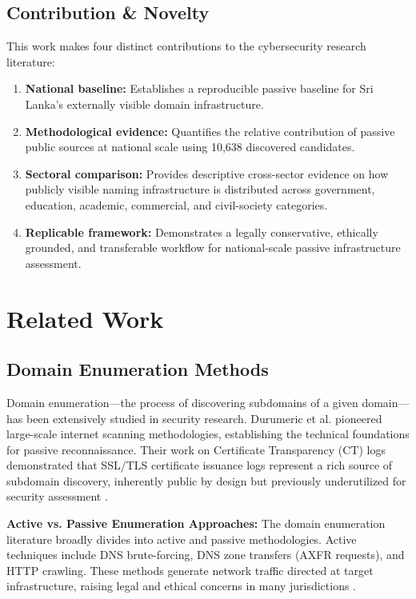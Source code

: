 \documentclass[preprint,review,12pt]{elsarticle}
\begin{document}
\subsection{Contribution \& Novelty}

This work makes four distinct contributions to the cybersecurity research literature:

\begin{enumerate}
    \item \textbf{National baseline:} Establishes a reproducible passive baseline for Sri Lanka's externally visible domain infrastructure.
    \item \textbf{Methodological evidence:} Quantifies the relative contribution of passive public sources at national scale using 10,638 discovered candidates.
    \item \textbf{Sectoral comparison:} Provides descriptive cross-sector evidence on how publicly visible naming infrastructure is distributed across government, education, academic, commercial, and civil-society categories.
    \item \textbf{Replicable framework:} Demonstrates a legally conservative, ethically grounded, and transferable workflow for national-scale passive infrastructure assessment.
\end{enumerate}

\section{Related Work}
\label{sec:related}

\subsection{Domain Enumeration Methods}

Domain enumeration—the process of discovering subdomains of a given domain—has been extensively studied in security research. Durumeric et al. \cite{durumeric2013zmap} pioneered large-scale internet scanning methodologies, establishing the technical foundations for passive reconnaissance. Their work on Certificate Transparency (CT) logs demonstrated that SSL/TLS certificate issuance logs represent a rich source of subdomain discovery, inherently public by design but previously underutilized for security assessment \cite{rfc6962}.

\textbf{Active vs. Passive Enumeration Approaches:} The domain enumeration literature broadly divides into active and passive methodologies. Active techniques include DNS brute-forcing, DNS zone transfers (AXFR requests), and HTTP crawling. These methods generate network traffic directed at target infrastructure, raising legal and ethical concerns in many jurisdictions \cite{kathrine2020comparative,dittrich2012community}.
\end{document}
